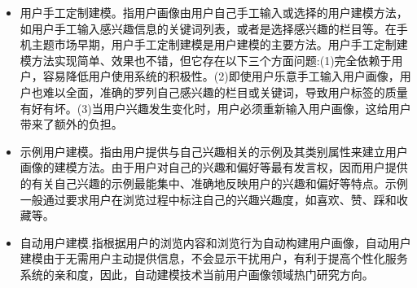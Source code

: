    \begin{itemize}
    \item 用户手工定制建模。指用户画像由用户自己手工输入或选择的用户建模方法，如用户手工输入感兴趣信息的关键词列表，或者是选择感兴趣的栏目等。在手机主题市场早期，用户手工定制建模是用户建模的主要方法。用户手工定制建模方法实现简单、效果也不错，但它存在以下三个方面问题:(1)完全依赖于用户，容易降低用户使用系统的积极性。(2)即使用户乐意手工输入用户画像，用户也难以全面，准确的罗列自己感兴趣的栏目或关键词，导致用户标签的质量有好有坏。(3)当用户兴趣发生变化时，用户必须重新输入用户画像，这给用户带来了额外的负担。
    \item 示例用户建模。指由用户提供与自己兴趣相关的示例及其类别属性来建立用户画像的建模方法。由于用户对自己的兴趣和偏好等最有发言权，因而用户提供的有关自己兴趣的示例最能集中、准确地反映用户的兴趣和偏好等特点。示例一般通过要求用户在浏览过程中标注自己的兴趣兴趣度，如喜欢、赞、踩和收藏等。
    \item 自动用户建模.指根据用户的浏览内容和浏览行为自动构建用户画像，自动用户建模由于无需用户主动提供信息，不会显示干扰用户，有利于提高个性化服务系统的亲和度，因此，自动建模技术当前用户画像领域热门研究方向。
    \end{itemize}

